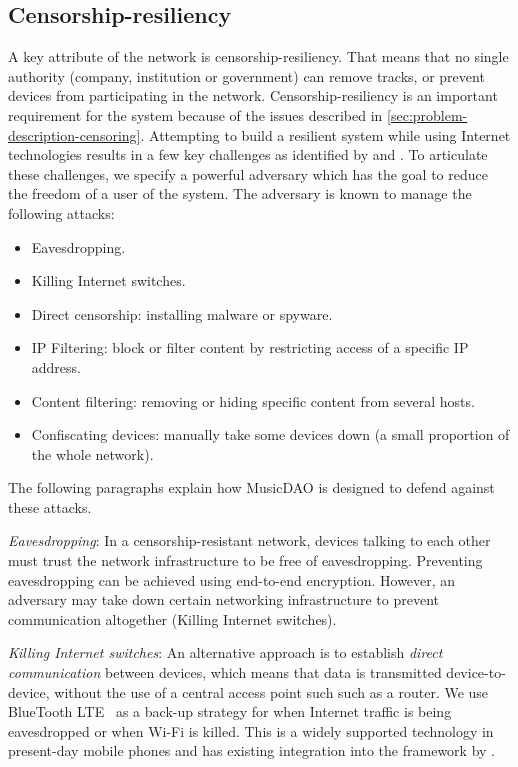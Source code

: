 \subsection{Censorship-resiliency}
A key attribute of the network is censorship-resiliency. That means that no single authority (company, institution or government) can remove tracks, or prevent devices from participating in the network. Censorship-resiliency is an important requirement for the system because of the issues described in \ref{sec:problem-description-censoring}. Attempting to build a resilient system while using Internet technologies results in a few key challenges as identified by \cite{pouwelse2012censorship} and \cite{di2014bypassing}. To articulate these challenges, we specify a powerful adversary which has the goal to reduce the freedom of a user of the system. The adversary is known to manage the following attacks:
\begin{itemize}
    \item Eavesdropping.
    \item Killing Internet switches. 
    \item Direct censorship: installing malware or spyware.
    \item IP Filtering: block or filter content by restricting access of a specific IP address.
    \item Content filtering: removing or hiding specific content from several hosts.
    \item Confiscating devices: manually take some devices down (a small proportion of the whole network).
\end{itemize}
The following paragraphs explain how MusicDAO is designed to defend against these attacks.

\textit{Eavesdropping}: In a censorship-resistant network, devices talking to each other must trust the network infrastructure to be free of eavesdropping. Preventing eavesdropping can be achieved using end-to-end encryption. However, an adversary may take down certain networking infrastructure to prevent communication altogether (Killing Internet switches).

\textit{Killing Internet switches}: An alternative approach is to establish \textit{direct communication} between devices, which means that data is transmitted device-to-device, without the use of a central access point such such as a router. We use BlueTooth LTE~\citep{townsend2014getting} as a back-up strategy for when Internet traffic is being eavesdropped or when Wi-Fi is killed. This is a widely supported technology in present-day mobile phones and has existing integration into the framework by \cite{mattskala2020}.

